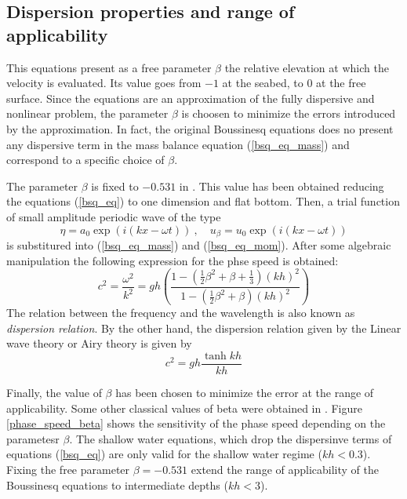 \subsection{Dispersion properties and range of applicability}

This equations present as a free parameter $\beta$ the relative elevation at which the velocity is evaluated. Its value goes from $-1$ at the seabed, to $0$ at the free surface. Since the equations are an approximation of the fully dispersive and nonlinear problem, the parameter $\beta$ is choosen to minimize the errors introduced by the approximation.
In fact, the original Boussinesq equations does no present any dispersive term in the mass balance equation (\ref{bsq_eq_mass}) and correspond to a specific choice of $\beta$.

The parameter $\beta$ is fixed to $-0.531$ in \cite{nwogu1993}. This value has been obtained reducing the equations (\ref{bsq_eq}) to one dimension and flat bottom. Then, a trial function of small amplitude periodic wave of the type
\begin{equation*}
    \eta = a_0 \exp(i(kx-\omega t)) \ , \quad u_\beta = u_0 \exp(i(kx-\omega t))
\end{equation*}
is substitured into (\ref{bsq_eq_mass}) and (\ref{bsq_eq_mom}). After some algebraic manipulation the following expression for the phse speed is obtained:
\begin{equation}
c^2 = \frac{\omega^2}{k^2} = gh
    \left(\frac{
        1-\left(\frac{1}{2}\beta^2 + \beta + \frac{1}{3}\right)(kh)^2
    }{
        1-\left(\frac{1}{2}\beta^2 + \beta\right)(kh)^2
    }\right)
\end{equation}
The relation between the frequency and the wavelength is also known as \emph{dispersion relation}.
By the other hand, the dispersion relation given by the Linear wave theory or Airy theory is given by
\begin{equation}
c^2 = gh \frac{\tanh kh}{kh}
\end{equation}

Finally, the value of $\beta$ has been chosen to minimize the error at the range of applicability. Some other classical values of beta were obtained in \cite{madsen1991,murray1989}. Figure \ref{phase_speed_beta} shows the sensitivity of the phase speed depending on the parametesr $\beta$. The shallow water equations, which drop the dispersinve terms of equations (\ref{bsq_eq}) are only valid for the shallow water regime ($kh<0.3$). Fixing the free parameter $\beta=-0.531$ extend the range of applicability of the Boussinesq equations to intermediate depths ($kh<3$).

